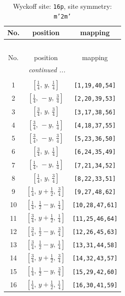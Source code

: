 \documentclass[fleqn,8pt]{jsarticle}
\begin{document}
\renewcommand{\arraystretch}{1.2}
\begin{longtable}{ccc}
\caption{Wyckoff site: {\tt 16p}, site symmetry: {\tt m'2m'}}
 \\
 \hline \hline
No. & position & mapping \\ \hline \endfirsthead

\multicolumn{2}{l}{\tablename\ \thetable{}} \\
 \hline \hline
No. & position & mapping \\ \hline \endhead

 \hline \hline
\multicolumn{2}{r}{\footnotesize\it continued ...} \\ \endfoot

 \hline \hline
\multicolumn{2}{r}{} \\ \endlastfoot

1 & $\left[ \frac{1}{4},\, y,\, \frac{1}{4} \right]$ & {\tt [1,19,40,54]} \\ \hline
2 & $\left[ \frac{1}{4},\, - y,\, \frac{3}{4} \right]$ & {\tt [2,20,39,53]} \\ \hline
3 & $\left[ \frac{3}{4},\, y,\, \frac{3}{4} \right]$ & {\tt [3,17,38,56]} \\ \hline
4 & $\left[ \frac{3}{4},\, - y,\, \frac{1}{4} \right]$ & {\tt [4,18,37,55]} \\ \hline
5 & $\left[ \frac{3}{4},\, - y,\, \frac{3}{4} \right]$ & {\tt [5,23,36,50]} \\ \hline
6 & $\left[ \frac{3}{4},\, y,\, \frac{1}{4} \right]$ & {\tt [6,24,35,49]} \\ \hline
7 & $\left[ \frac{1}{4},\, - y,\, \frac{1}{4} \right]$ & {\tt [7,21,34,52]} \\ \hline
8 & $\left[ \frac{1}{4},\, y,\, \frac{3}{4} \right]$ & {\tt [8,22,33,51]} \\ \hline
9 & $\left[ \frac{1}{4},\, y + \frac{1}{2},\, \frac{3}{4} \right]$ & {\tt [9,27,48,62]} \\ \hline
10 & $\left[ \frac{1}{4},\, \frac{1}{2} - y,\, \frac{1}{4} \right]$ & {\tt [10,28,47,61]} \\ \hline
11 & $\left[ \frac{3}{4},\, y + \frac{1}{2},\, \frac{1}{4} \right]$ & {\tt [11,25,46,64]} \\ \hline
12 & $\left[ \frac{3}{4},\, \frac{1}{2} - y,\, \frac{3}{4} \right]$ & {\tt [12,26,45,63]} \\ \hline
13 & $\left[ \frac{3}{4},\, \frac{1}{2} - y,\, \frac{1}{4} \right]$ & {\tt [13,31,44,58]} \\ \hline
14 & $\left[ \frac{3}{4},\, y + \frac{1}{2},\, \frac{3}{4} \right]$ & {\tt [14,32,43,57]} \\ \hline
15 & $\left[ \frac{1}{4},\, \frac{1}{2} - y,\, \frac{3}{4} \right]$ & {\tt [15,29,42,60]} \\ \hline
16 & $\left[ \frac{1}{4},\, y + \frac{1}{2},\, \frac{1}{4} \right]$ & {\tt [16,30,41,59]} \\
\end{longtable}
\end{document}
